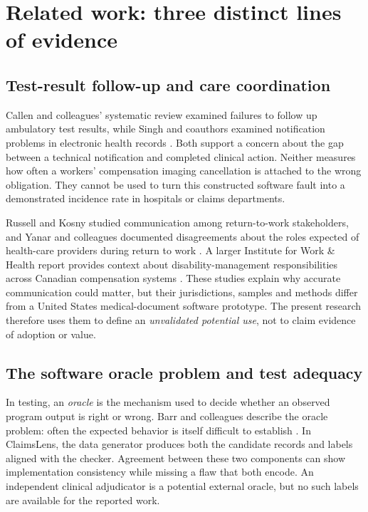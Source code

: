 \documentclass[11pt,twocolumn]{article}
\begin{document}
\section{Related work: three distinct lines of evidence}\label{sec:related}
\subsection{Test-result follow-up and care coordination}
Callen and colleagues' systematic review examined failures to follow up ambulatory test results, while Singh and coauthors examined notification problems in electronic health records \cite{callen2012,singh2009,singh2010}. Both support a concern about the gap between a technical notification and completed clinical action. Neither measures how often a workers' compensation imaging cancellation is attached to the wrong obligation. They cannot be used to turn this constructed software fault into a demonstrated incidence rate in hospitals or claims departments.

Russell and Kosny studied communication among return-to-work stakeholders, and Yanar and colleagues documented disagreements about the roles expected of health-care providers during return to work \cite{russell2019,yanar2019}. A larger Institute for Work \& Health report provides context about disability-management responsibilities across Canadian compensation systems \cite{kosny2016}. These studies explain why accurate communication could matter, but their jurisdictions, samples and methods differ from a United States medical-document software prototype. The present research therefore uses them to define an \emph{unvalidated potential use}, not to claim evidence of adoption or value.

\subsection{The software oracle problem and test adequacy}
In testing, an \emph{oracle} is the mechanism used to decide whether an observed program output is right or wrong. Barr and colleagues describe the oracle problem: often the expected behavior is itself difficult to establish \cite{barr2015}. In ClaimsLens, the data generator produces both the candidate records and labels aligned with the checker. Agreement between these two components can show implementation consistency while missing a flaw that both encode. An independent clinical adjudicator is a potential external oracle, but no such labels are available for the reported work.
\end{document}
